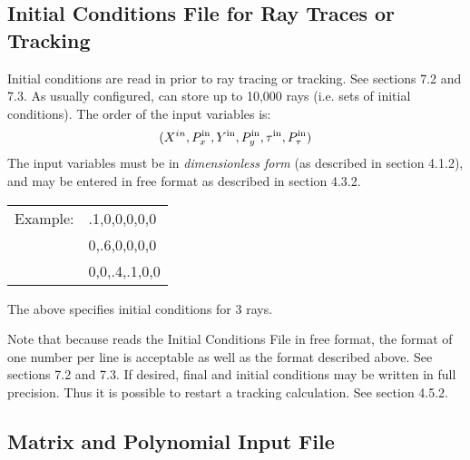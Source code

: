 \subsection{Initial Conditions File for Ray Traces or Tracking}
     Initial conditions are read in prior to ray tracing or tracking.     See
sections 7.2 and 7.3.  As usually configured, \Mary can store up to 10,000 rays (i.e.
sets of initial conditions).  The order of the input variables is:
     \[(X^{{\scriptsize in}}, P_x^{\mbox{\scriptsize in}}, Y^{\mbox{\scriptsize in}}, P_{y}^{\mbox{\scriptsize in}}, {\tau}^{\mbox{\scriptsize in}}, P_{\tau}^{\mbox{\scriptsize in}})\]
The input variables must be in {\em dimensionless form} (as described in section
4.1.2), and may be entered in free format as described in section 4.3.2.
\begin{center}
\begin{tabular}{ll}
     Example:           &        .1,0,0,0,0,0 \\
                        &        0,.6,0,0,0,0 \\
                        &        0,0,.4,.1,0,0
\end{tabular}
\end{center}
The above specifies initial conditions for 3 rays.

     Note that because \Mary reads the Initial Conditions File in free
format, the format of one number per line is acceptable as well as the
format described above.  See sections 7.2 and 7.3.  If desired, final and
initial conditions may be written in full precision.  Thus it is possible
to restart a tracking calculation.  See section 4.5.2.

\subsection{Matrix and Polynomial Input File}

